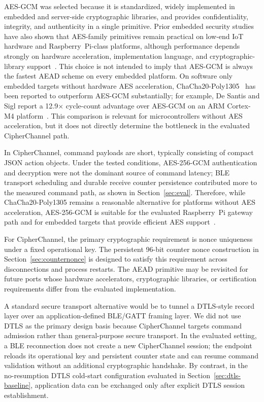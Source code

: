 \documentclass[journal]{IEEEtran}
\begin{document}
AES-GCM was selected because it is standardized, widely implemented in embedded and server-side cryptographic libraries, and provides confidentiality, integrity, and authenticity in a single primitive. Prior embedded security studies have also shown that AES-family primitives remain practical on low-end IoT hardware and Raspberry~Pi-class platforms, although performance depends strongly on hardware acceleration, implementation language, and cryptographic-library support~\cite{kietzmann2021hw, riddle2023aespie}. This choice is not intended to imply that AES-GCM is always the fastest AEAD scheme on every embedded platform. On software only embedded targets without hardware AES acceleration, ChaCha20-Poly1305~\cite{desantis2017chacha20} has been reported to outperform AES-GCM substantially; for example, De Santis and Sigl report a 12.9$\times$ cycle-count advantage over AES-GCM on an ARM Cortex-M4 platform~\cite{desantis2017chacha20}. This comparison is relevant for microcontrollers without AES acceleration, but it does not directly determine the bottleneck in the evaluated CipherChannel path.

In CipherChannel, command payloads are short, typically consisting of compact JSON action objects. Under the tested conditions, AES-256-GCM authentication and decryption were not the dominant source of command latency; BLE transport scheduling and durable receive counter persistence contributed more to the measured command path, as shown in Section~\ref{sec:eval}. Therefore, while ChaCha20-Poly1305 remains a reasonable alternative for platforms without AES acceleration, AES-256-GCM is suitable for the evaluated Raspberry~Pi gateway path and for embedded targets that provide efficient AES support~\cite{desantis2017chacha20}.

For CipherChannel, the primary cryptographic requirement is nonce uniqueness under a fixed operational key. The persistent 96-bit counter nonce construction in Section~\ref{sec:counternonce} is designed to satisfy this requirement across disconnections and process restarts. The AEAD primitive may be revisited for future ports whose hardware accelerators, cryptographic libraries, or certification requirements differ from the evaluated implementation.

A standard secure transport alternative would be to tunnel a DTLS-style record layer over an application-defined BLE/GATT framing layer. We did not use DTLS as the primary design basis because CipherChannel targets command admission rather than general-purpose secure transport. In the evaluated setting, a BLE reconnection does not create a new CipherChannel session; the endpoint reloads its operational key and persistent counter state and can resume command validation without an additional cryptographic handshake. By contrast, in the no-resumption DTLS cold-start configuration evaluated in Section~\ref{sec:dtls-baseline}, application data can be exchanged only after explicit DTLS session establishment.
\end{document}
